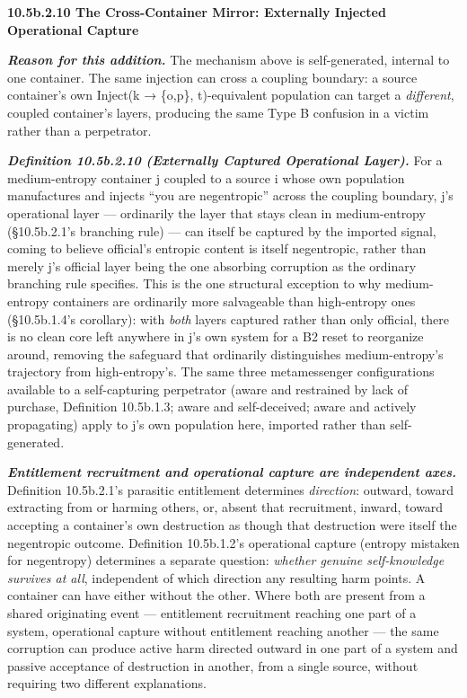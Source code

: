 \documentclass[
]{article}
\begin{document}
\textbf{10.5b.2.10 The Cross-Container Mirror: Externally Injected
Operational Capture}

\emph{\textbf{Reason for this addition.}} The mechanism above is
self-generated, internal to one container. The same injection can cross
a coupling boundary: a source container's own Inject(k → \{o,p\},
t)-equivalent population can target a \emph{different}, coupled
container's layers, producing the same Type B confusion in a victim
rather than a perpetrator.

\emph{\textbf{Definition 10.5b.2.10 (Externally Captured Operational
Layer).}} For a medium-entropy container j coupled to a source i whose
own population manufactures and injects ``you are negentropic'' across
the coupling boundary, j's operational layer --- ordinarily the layer
that stays clean in medium-entropy (§10.5b.2.1's branching rule) --- can
itself be captured by the imported signal, coming to believe official's
entropic content is itself negentropic, rather than merely j's official
layer being the one absorbing corruption as the ordinary branching rule
specifies. This is the one structural exception to why medium-entropy
containers are ordinarily more salvageable than high-entropy ones
(§10.5b.1.4's corollary): with \emph{both} layers captured rather than
only official, there is no clean core left anywhere in j's own system
for a B2 reset to reorganize around, removing the safeguard that
ordinarily distinguishes medium-entropy's trajectory from
high-entropy's. The same three metamessenger configurations available to
a self-capturing perpetrator (aware and restrained by lack of purchase,
Definition 10.5b.1.3; aware and self-deceived; aware and actively
propagating) apply to j's own population here, imported rather than
self-generated.

\emph{\textbf{Entitlement recruitment and operational capture are
independent axes.}} Definition 10.5b.2.1's parasitic entitlement
determines \emph{direction}: outward, toward extracting from or harming
others, or, absent that recruitment, inward, toward accepting a
container's own destruction as though that destruction were itself the
negentropic outcome. Definition 10.5b.1.2's operational capture (entropy
mistaken for negentropy) determines a separate question: \emph{whether
genuine self-knowledge survives at all}, independent of which direction
any resulting harm points. A container can have either without the
other. Where both are present from a shared originating event ---
entitlement recruitment reaching one part of a system, operational
capture without entitlement reaching another --- the same corruption can
produce active harm directed outward in one part of a system and passive
acceptance of destruction in another, from a single source, without
requiring two different explanations.
\end{document}
